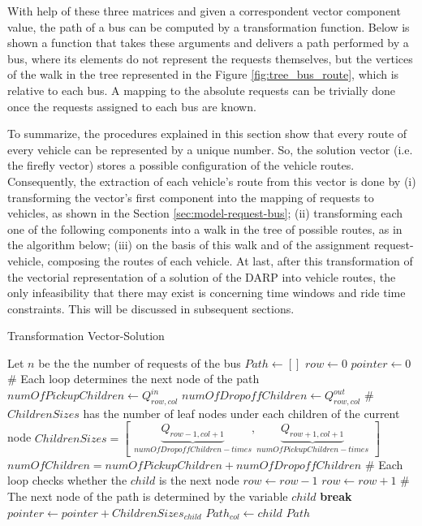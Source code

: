 \documentclass[tuberlin,cic,tc,openright,english,noabntcite,oneside]{iiufrgs}
\begin{document}
With help of these three matrices and given a correspondent vector component value, the path of a bus can be computed by a transformation function. Below is shown a function that takes these arguments and delivers a path performed by a bus, where its elements do not represent the requests themselves, but the vertices of the walk in the tree represented in the Figure \ref{fig:tree_bus_route}, which is relative to each bus. A mapping to the absolute requests can be trivially done once the requests assigned to each bus are known.

To summarize, the procedures explained in this section show that every route of every vehicle can be represented by a unique number. So, the solution vector (i.e. the firefly vector) stores a possible configuration of the vehicle routes. Consequently, the extraction of each vehicle's route from this vector is done by (i) transforming the vector's first component into the mapping of requests to vehicles, as shown in the Section \ref{sec:model-request-bus}; (ii) transforming each one of the following components into a walk in the tree of possible routes, as in the algorithm below; (iii) on the basis of this walk and of the assignment request-vehicle, composing the routes of each vehicle. At last, after this transformation of the vectorial representation of a solution of the DARP into vehicle routes, the only infeasibility that there may exist is concerning time windows and ride time constraints. This will be discussed in subsequent sections.
\begin{algorithm}[H]
\caption{Transformation Vector-Solution}
\begin{algorithmic}
\State Let $n$ be the the number of requests of the bus
\State $Path \gets [ ]$
\State $row \gets 0$
\State $pointer \gets 0$
	\State \# Each loop determines the next node of the path
	\State $\mathit{numOfPickupChildren} \gets Q^{in}_{row,col}$
	\State $\mathit{numOfDropoffChildren} \gets Q^{out}_{row,col}$
	\State \# $ChildrenSizes$ has the number of leaf nodes under each children of the current node
	\State $\displaystyle ChildrenSizes = \begin{bmatrix}\underbrace{Q_{row-1,col+1}}_{\mathit{numOfDropoffChildren}-times}
			, \underbrace{Q_{row+1,col+1}}_{\mathit{numOfPickupChildren}-times}\end{bmatrix}$
	\State $\mathit{numOfChildren} = \mathit{numOfPickupChildren} + \mathit{numOfDropoffChildren}$
		\State \# Each loop checks whether the $child$ is the next node
				\State $row \gets row - 1$
			\Else
				\State $row \gets row + 1$
			\EndIf
			\State \# The next node of the path is determined by the variable $child$
			\State \textbf{break}
		\Else
			\State $pointer \gets pointer + ChildrenSizes_{child}$
		\EndIf
	\EndFor
	\State $Path_{col} \gets child$
\EndFor
\State \Return $Path$
\EndFunction
\end{algorithmic}
\end{algorithm}
\end{document}
